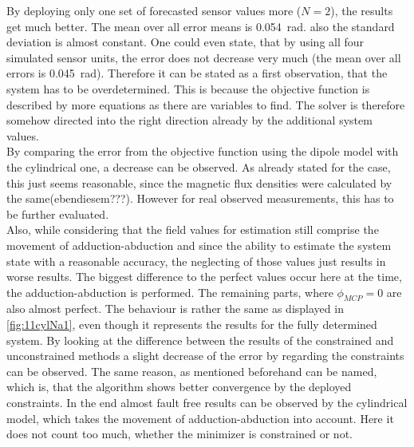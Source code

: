 By deploying only one set of forecasted sensor values more ($ N = 2 $), the results get much better. The mean over all error means is \SI{0.054}{\radian}. also the standard deviation is almost constant. One could even state, that by using all four simulated sensor units, the error does not decrease very much (the mean over all errors is \SI{0.045}{\radian}). Therefore it can be stated as a first observation, that the system has to be overdetermined. This is because the objective function is described by more equations as there are variables to find. The solver is therefore somehow directed into the right direction already by the additional system values.\\
By comparing the error from the objective function using the dipole model with the cylindrical one, a decrease can be observed. As already stated for the \grqq case, this just seems reasonable, since the magnetic flux densities were calculated by the same(ebendiesem???). However for real observed measurements, this has to be further evaluated.\\
Also, while considering that the field values for estimation still comprise the movement of adduction-abduction and since the ability to estimate the system state with a reasonable accuracy, the neglecting of those values just results in worse results. The biggest difference to the perfect values occur here at the time, the adduction-abduction is performed. The remaining parts, where $ \phi_{MCP} = 0 $ are also almost perfect. The behaviour is rather the same as displayed in \ref{fig:11cylNa1}, even though it represents the results for the fully determined system. By looking at the difference between the results of the constrained and unconstrained methods a slight decrease of the error by regarding the constraints can be observed. The same reason, as mentioned beforehand can be named, which is, that the algorithm shows better convergence by the deployed constraints. In the end almost fault free results can be observed by the cylindrical model, which takes the movement of adduction-abduction into account. Here it does not count too much, whether the minimizer is constrained or not. %
